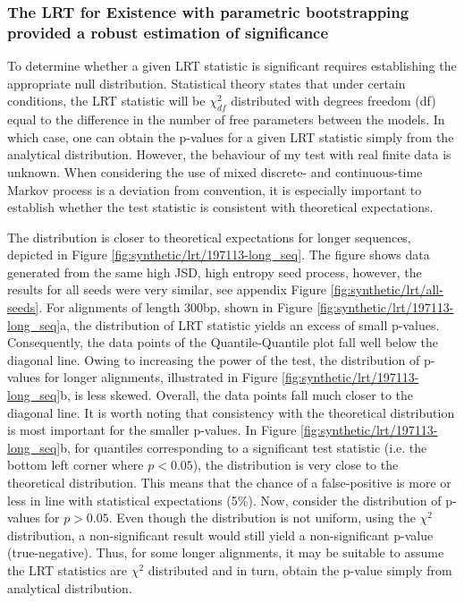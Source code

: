 \subsubsection*{The LRT for Existence with parametric bootstrapping provided a robust estimation of significance}

To determine whether a given LRT statistic is significant requires establishing the appropriate null distribution. Statistical theory states that under certain conditions, the LRT statistic will be $\chi^2_{df}$ distributed with degrees freedom (df) equal to the difference in the number of free parameters between the models. In which case, one can obtain the p-values for a given LRT statistic simply from the analytical distribution. However, the behaviour of my test with real finite data is unknown. When considering the use of mixed discrete- and continuous-time Markov process is a deviation from convention, it is especially important to establish whether the test statistic is consistent with theoretical expectations. 

The distribution is closer to theoretical expectations for longer sequences, depicted in Figure \ref{fig:synthetic/lrt/197113-long_seq}. The figure shows data generated from the same high JSD, high entropy seed process, however, the results for all seeds were very similar, see appendix Figure \ref{fig:synthetic/lrt/all-seeds}. For alignments of length 300bp, shown in Figure \ref{fig:synthetic/lrt/197113-long_seq}a, the distribution of LRT statistic yields an excess of small p-values. Consequently, the data points of the Quantile-Quantile plot fall well below the diagonal line. Owing to increasing the power of the test, the distribution of p-values for longer alignments, illustrated in Figure \ref{fig:synthetic/lrt/197113-long_seq}b, is less skewed. Overall, the data points fall much closer to the diagonal line. It is worth noting that consistency with the theoretical distribution is most important for the smaller p-values. In Figure \ref{fig:synthetic/lrt/197113-long_seq}b, for quantiles corresponding to a significant test statistic (i.e. the bottom left corner where $p<0.05$), the distribution is very close to the theoretical distribution. This means that the chance of a false-positive is more or less in line with statistical expectations (5\%). Now, consider the distribution of p-values for $p>0.05$. Even though the distribution is not uniform, using the $\chi^{2}$ distribution, a non-significant result would still yield a non-significant p-value (true-negative). Thus, for some longer alignments, it may be suitable to assume the LRT statistics are $\chi^{2}$ distributed and in turn, obtain the p-value simply from analytical distribution. 

